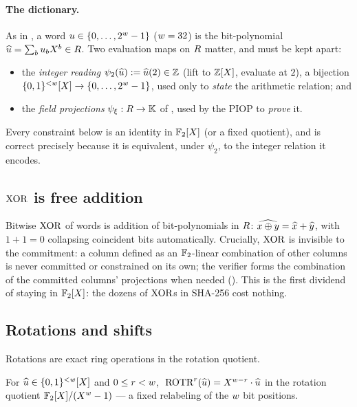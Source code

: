 \paragraph{The dictionary.} As in , a word
$u\in\{0,\dots,2^{w}-1\}$ ($w = 32$) is the bit-polynomial
$\widehat{u} = \sum_b u_b X^b \in R$. Two evaluation maps on
$R$ matter, and must be kept apart:
\begin{itemize}[leftmargin=2em]
  \item the \emph{integer reading} $\psi_2(\widehat{u}) := \widehat{u}(2) \in \mathbb{Z}$
    (lift to $\mathbb{Z}[X]$, evaluate at $2$), a bijection
    $\{0,1\}^{<w}[X]\to\{0,\dots,2^{w}-1\}$, used only to \emph{state}
    the arithmetic relation; and
  \item the \emph{field projections} $\psi_\xi:R\to\mathbb{K}$ of
    , used by the PIOP to \emph{prove} it.
\end{itemize}
Every constraint below is an identity in $\mathbb{F}_2[X]$ (or a fixed
quotient), and is correct precisely because it is equivalent, under
$\psi_2$, to the integer relation it encodes.

\subsection{$\operatorname{XOR}$ is free addition}
\label{sec:xor}

Bitwise $\operatorname{XOR}$ of words is addition of bit-polynomials in $R$:
$\widehat{x\oplus y} = \widehat{x}+\widehat{y}$, with $1+1 = 0$ collapsing
coincident bits automatically. Crucially, $\operatorname{XOR}$ is invisible to the
commitment: a column defined as an $\mathbb{F}_2$-linear combination of other
columns is never committed or constrained on its own; the verifier forms
the combination of the committed columns' projections when needed
(). This is the first dividend of staying in
$\mathbb{F}_2[X]$: the dozens of $\operatorname{XOR}$s in SHA-256 cost nothing.

\subsection{Rotations and shifts}
\label{sec:rot-shift}

Rotations are exact ring operations in the rotation quotient.

\begin{lemma}
\label{lem:rot}
For $\widehat{u}\in\{0,1\}^{<w}[X]$ and $0\le r<w$,
$\;\operatorname{ROTR}^{r}(\widehat{u}) = X^{w-r}\cdot\widehat{u}$ in the rotation quotient
$\mathbb{F}_2[X]/(X^{w}-1)$ --- a fixed relabeling of the $w$ bit positions.
\end{lemma}

